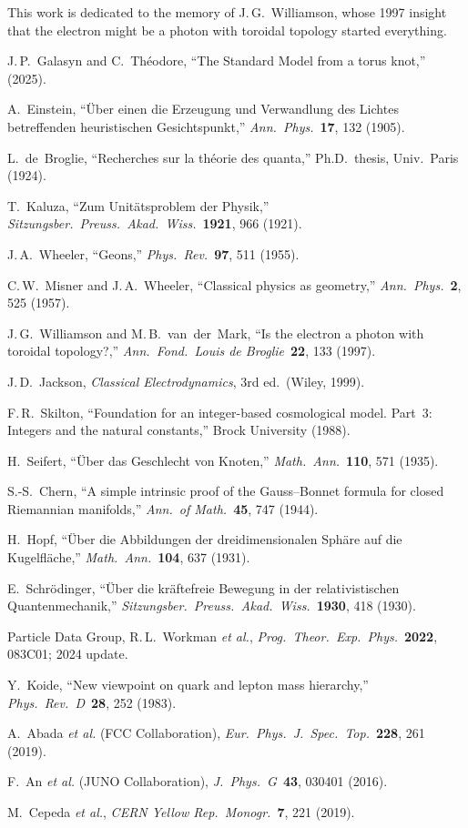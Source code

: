 \documentclass[10pt,twoside,a5paper]{article}
\begin{document}
This work is dedicated to the memory of J.\,G.~Williamson, whose 1997 insight that the electron might be a photon with toroidal topology started everything.


\vskip 30pt
\begin{eref}

\bibitem{} J.\,P.~Galasyn and C.~Th\'eodore,
``The Standard Model from a torus knot,'' (2025).

\bibitem{} A.~Einstein,
``\"Uber einen die Erzeugung und Verwandlung des Lichtes betreffenden heuristischen Gesichtspunkt,''
\emph{Ann.\ Phys.}\ {\bf 17}, 132 (1905).

\bibitem{} L.~de~Broglie,
``Recherches sur la th\'eorie des quanta,''
Ph.D.\ thesis, Univ.\ Paris (1924).

\bibitem{} T.~Kaluza,
``Zum Unit\"atsproblem der Physik,''
\emph{Sitzungsber.\ Preuss.\ Akad.\ Wiss.}\ {\bf 1921}, 966 (1921).

\bibitem{} J.\,A.~Wheeler,
``Geons,''
\emph{Phys.\ Rev.}\ {\bf 97}, 511 (1955).

\bibitem{} C.\,W.~Misner and J.\,A.~Wheeler,
``Classical physics as geometry,''
\emph{Ann.\ Phys.}\ {\bf 2}, 525 (1957).

\bibitem{} J.\,G.~Williamson and M.\,B.~van~der~Mark,
``Is the electron a photon with toroidal topology?,''
\emph{Ann.\ Fond.\ Louis de Broglie}\ {\bf 22}, 133 (1997).

\bibitem{} J.\,D.~Jackson,
\emph{Classical Electrodynamics}, 3rd ed.\ (Wiley, 1999).

\bibitem{} F.\,R.~Skilton,
``Foundation for an integer-based cosmological model. Part~3: Integers and the natural constants,''
Brock University (1988).

\bibitem{} H.~Seifert,
``\"Uber das Geschlecht von Knoten,''
\emph{Math.\ Ann.}\ {\bf 110}, 571 (1935).

\bibitem{} S.-S.~Chern,
``A simple intrinsic proof of the Gauss--Bonnet formula for closed Riemannian manifolds,''
\emph{Ann.\ of Math.}\ {\bf 45}, 747 (1944).

\bibitem{} H.~Hopf,
``\"Uber die Abbildungen der dreidimensionalen Sph\"are auf die Kugelfl\"ache,''
\emph{Math.\ Ann.}\ {\bf 104}, 637 (1931).

\bibitem{} E.~Schr\"odinger,
``\"Uber die kr\"aftefreie Bewegung in der relativistischen Quantenmechanik,''
\emph{Sitzungsber.\ Preuss.\ Akad.\ Wiss.}\ {\bf 1930}, 418 (1930).

\bibitem{} Particle Data Group, R.\,L.~Workman \emph{et al.},
\emph{Prog.\ Theor.\ Exp.\ Phys.}\ {\bf 2022}, 083C01; 2024 update.

\bibitem{} Y.~Koide,
``New viewpoint on quark and lepton mass hierarchy,''
\emph{Phys.\ Rev.\ D}\ {\bf 28}, 252 (1983).

\bibitem{} A.~Abada \emph{et al.} (FCC Collaboration),
\emph{Eur.\ Phys.\ J.\ Spec.\ Top.}\ {\bf 228}, 261 (2019).

\bibitem{} F.~An \emph{et al.} (JUNO Collaboration),
\emph{J.\ Phys.\ G}\ {\bf 43}, 030401 (2016).

\bibitem{} M.~Cepeda \emph{et al.},
\emph{CERN Yellow Rep.\ Monogr.}\ {\bf 7}, 221 (2019).

\end{eref}

\end{document}
